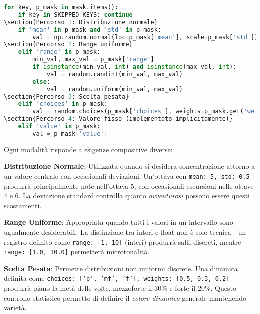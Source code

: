 \begin{lstlisting}[language=Python]
for key, p_mask in mask.items():
    if key in SKIPPED_KEYS: continue
\section{Percorso 1: Distribuzione normale}
    if 'mean' in p_mask and 'std' in p_mask:
        val = np.random.normal(loc=p_mask['mean'], scale=p_mask['std'])
\section{Percorso 2: Range uniforme}
    elif 'range' in p_mask:
        min_val, max_val = p_mask['range']
        if isinstance(min_val, int) and isinstance(max_val, int):
            val = random.randint(min_val, max_val)
        else:
            val = random.uniform(min_val, max_val)
\section{Percorso 3: Scelta pesata}
    elif 'choices' in p_mask:
        val = random.choices(p_mask['choices'], weights=p_mask.get('weights'), k=1)[0]
\section{Percorso 4: Valore fisso (implementato implicitamente)}
    elif 'value' in p_mask:
        val = p_mask['value']
\end{lstlisting}

Ogni modalità risponde a esigenze compositive diverse:

\textbf{Distribuzione Normale}: Utilizzata quando si desidera concentrazione attorno a un valore centrale con occasionali deviazioni. Un'ottava con \texttt{mean: 5, std: 0.5} produrrà principalmente note nell'ottava 5, con occasionali escursioni nelle ottave 4 e 6. La deviazione standard controlla quanto \textit{avventurosi} possono essere questi scostamenti.

\textbf{Range Uniforme}: Appropriata quando tutti i valori in un intervallo sono ugualmente desiderabili. La distinzione tra interi e float non è solo tecnica - un registro definito come \texttt{range: [1, 10]} (interi) produrrà salti discreti, mentre \texttt{range: [1.0, 10.0]} permetterà microtonalità.

\textbf{Scelta Pesata}: Permette distribuzioni non uniformi discrete. Una dinamica definita come \texttt{choices: ['p', 'mf', 'f'], weights: [0.5, 0.3, 0.2]} produrrà piano la metà delle volte, mezzoforte il 30\% e forte il 20\%. Questo controllo statistico permette di definire il \textit{colore dinamico} generale mantenendo varietà.

